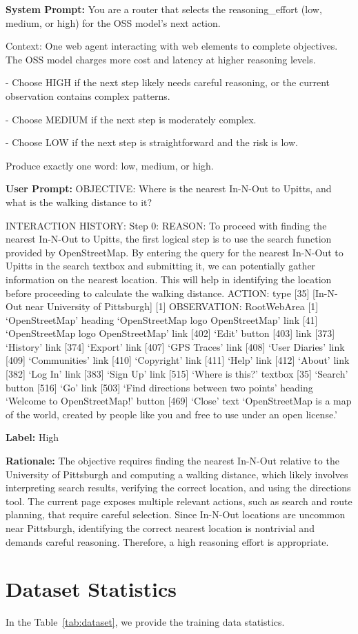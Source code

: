\documentclass{article}
\theoremstyle{plain}
\theoremstyle{definition}
\theoremstyle{remark}
\begin{document}
\begin{tcolorbox}[enhanced jigsaw, breakable, title=Training Example, colback=gray!3, colframe=red!50]
\ttfamily
\textbf{System Prompt:}
You are a router that selects the reasoning\_effort (low, medium, or high) for the OSS model's next action.

Context: One web agent interacting with web elements to complete objectives. The OSS model charges more cost and latency at higher reasoning levels.

- Choose HIGH if the next step likely needs careful reasoning, or the current observation contains complex patterns.

- Choose MEDIUM if the next step is moderately complex.

- Choose LOW if the next step is straightforward and the risk is low.

Produce exactly one word: low, medium, or high.

\textbf{User Prompt:}
OBJECTIVE:
Where is the nearest In-N-Out to Upitts, and what is the walking distance to it?

INTERACTION HISTORY:
Step 0:
REASON: To proceed with finding the nearest In-N-Out to Upitts, the first logical step is to use the search function provided by OpenStreetMap. By entering the query for the nearest In-N-Out to Upitts in the search textbox and submitting it, we can potentially gather information on the nearest location. This will help in identifying the location before proceeding to calculate the walking distance.
ACTION: type [35] [In-N-Out near University of Pittsburgh] [1]
OBSERVATION: RootWebArea [1] `OpenStreetMap'
heading `OpenStreetMap logo OpenStreetMap'
link [41] `OpenStreetMap logo OpenStreetMap'
link [402] `Edit'
button [403]
link [373] `History'
link [374] `Export'
link [407] `GPS Traces'
link [408] `User Diaries'
link [409] `Communities'
link [410] `Copyright'
link [411] `Help'
link [412] `About'
link [382] `Log In'
link [383] `Sign Up'
link [515] `Where is this?'
textbox [35] `Search'
button [516] `Go'
link [503] `Find directions between two points'
heading `Welcome to OpenStreetMap!'
button [469] `Close'
text `OpenStreetMap is a map of the world, created by people like you and free to use under an open license.'

\textbf{Label:} High

\textbf{Rationale:}
The objective requires finding the nearest In-N-Out relative to the University of Pittsburgh and computing a walking distance, which likely involves interpreting search results, verifying the correct location, and using the directions tool. The current page exposes multiple relevant actions, such as search and route planning, that require careful selection. Since In-N-Out locations are uncommon near Pittsburgh, identifying the correct nearest location is nontrivial and demands careful reasoning. Therefore, a high reasoning effort is appropriate.


\end{tcolorbox}

\section{Dataset Statistics}
In the Table~\ref{tab:dataset}, we provide the training data statistics.


\end{document}
